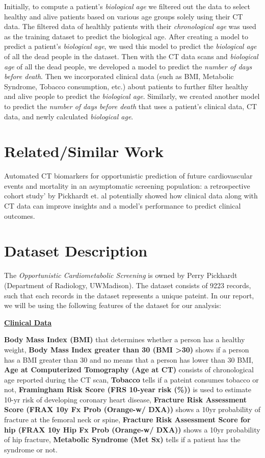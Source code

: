 \documentclass{article}
\begin{document}
Initially, to compute a patient's \emph{biological age} we filtered out the data to select healthy and alive patients based on various age groups solely using their CT data. The filtered data of healthly patients with their \emph{chronological age} was used as the training dataset to predict the biological age. After creating a model to predict a patient's \emph{biological age}, we used this model to predict the \emph{biological age} of all the dead people in the dataset. Then with the CT data scans and \emph{biological age} of all the dead people, we developed a model to predict the \emph{number of days before death}. 
Then we incorporated clinical data (such as BMI, Metabolic Syndrome, Tobacco consumption, etc.) about patients to further filter healthy and alive people to predict the \emph{biological age}. Similarly, we created another model to predict the \emph{number of days before death} that uses a patient's clinical data, CT data, and newly calculated \emph{biological age}.

\section{Related/Similar Work}

Automated CT biomarkers for opportunistic prediction of future cardiovascular events and mortality in an asymptomatic screening population: a retrospective cohort study' by Pickhardt et. al potentially showed how clinical data along with CT data can improve insights and a model's performance to predict clinical outcomes.

\section{Dataset Description}

The \emph{Opportunistic Cardiometabolic Screening} is owned by Perry Pickhardt (Department of Radiology, UWMadison). The dataset consists of 9223 records, such that each records in the dataset represents a unique pateint. In our report, we will be using the following features of the dataset for our analysis:

\underline{\textbf{Clinical Data}}
 
\textbf{Body Mass Index (BMI)} that determines whether a person has a healthy weight, \textbf{Body Mass Index greater than 30 (BMI \textgreater{30})} shows if a person has a BMI greater than 30 and no means that a person has lower than 30 BMI, \textbf{Age at Computerized Tomography (Age at CT)} consists of chronological age reported during the CT scan, \textbf{Tobacco} tells if a pateint consumes tobacco or not, \textbf{Framingham Risk Score (FRS 10-year risk (\%))} is used to estimate 10-yr risk of developing coronary heart disease, \textbf{Fracture Risk Assessment Score (FRAX 10y Fx Prob (Orange-w/ DXA))} shows a 10yr probability of fracture at the femoral neck or spine, \textbf{Fracture Risk Assessment Score for hip (FRAX 10y Hip Fx Prob (Orange-w/ DXA))} shows a 10yr probability of hip fracture, \textbf{Metabolic Syndrome (Met Sx)} tells if a patient has the syndrome or not.
  
\end{document}
